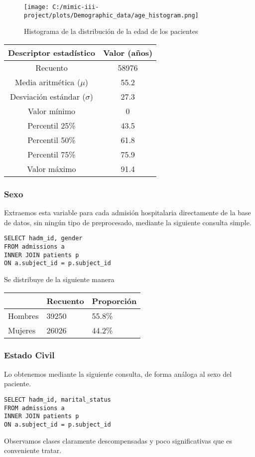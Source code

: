 \documentclass{report}
\begin{document}
\begin{figure}[h]
\centering
\texttt{[image: C:/mimic-iii-project/plots/Demographic\_data/age\_histogram.png]}
\caption{Histograma de la distribución de la edad de los pacientes}
\end{figure}
\newpage
\begin{longtable}[]{@{}cc@{}}
\toprule
Descriptor estadístico & Valor (años)\tabularnewline
\midrule
\endhead
Recuento & 58976\tabularnewline
Media aritmética ($\mu$) & 55.2\tabularnewline
Desviación estándar ($\sigma$) & 27.3\tabularnewline
Valor mínimo & 0\tabularnewline
Percentil 25\% & 43.5\tabularnewline
Percentil 50\% & 61.8\tabularnewline
Percentil 75\% & 75.9\tabularnewline
Valor máximo & 91.4\tabularnewline
\bottomrule
\end{longtable}

\subsubsection{Sexo}

Extraemos esta variable para cada admisión hospitalaria directamente de la base de datos, sin ningún tipo de preprocesado, mediante la siguiente consulta simple. 
\begin{verbatim}
SELECT hadm_id, gender
FROM admissions a
INNER JOIN patients p
ON a.subject_id = p.subject_id
\end{verbatim}

Se distribuye de la siguiente manera

\begin{longtable}[]{@{}lll@{}}
\toprule
 & Recuento & Proporción\tabularnewline
\midrule
\endhead
Hombres & 39250 & 55.8\% \tabularnewline
Mujeres & 26026 & 44.2\% \tabularnewline
\bottomrule
\end{longtable}

\subsubsection{Estado Civil}

Lo obtenemos mediante la siguiente consulta, de forma análoga al sexo del paciente.

\begin{verbatim}
SELECT hadm_id, marital_status
FROM admissions a
INNER JOIN patients p
ON a.subject_id = p.subject_id
\end{verbatim}
Observamos clases claramente descompensadas y poco significativas que es conveniente tratar. 
\end{document}
